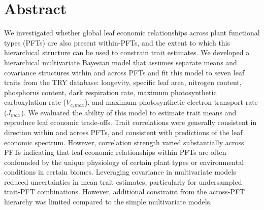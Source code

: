\section{Abstract}
\label{sec:mvtraits-abstract}

We investigated whether global leaf economic relationships across plant functional types (PFTs) are also present within-PFTs, and the extent to which this hierarchical structure can be used to constrain trait estimates.
We developed a hierarchical multivariate Bayesian model that assumes separate means and covariance structures within and across PFTs and fit this model to seven leaf traits from the TRY database: longevity, specific leaf area, nitrogen content, phosphorus content, dark respiration rate, maximum photosynthetic carboxylation rate ($V_{c,max}$), and maximum photosynthetic electron transport rate ($J_{max}$). 
We evaluated the ability of this model to estimate trait means and reproduce leaf economic trade-offs.
Trait correlations were generally consistent in direction within and across PFTs, and consistent with predictions of the leaf economic spectrum.
However, correlation strength varied substantially across PFTs indicating that leaf economic relationships within PFTs are often confounded by the unique physiology of certain plant types or environmental conditions in certain biomes.
Leveraging covariance in multivariate models reduced uncertainties in mean trait estimates, particularly for undersampled trait-PFT combinations.
However, additional constraint from the across-PFT hierarchy was limited compared to the simple multivariate models.

